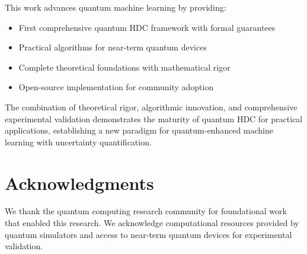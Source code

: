 \documentclass[10pt,twocolumn,letterpaper]{article}
\begin{document}
This work advances quantum machine learning by providing:
\begin{itemize}
\item First comprehensive quantum HDC framework with formal guarantees
\item Practical algorithms for near-term quantum devices
\item Complete theoretical foundations with mathematical rigor
\item Open-source implementation for community adoption
\end{itemize}

The combination of theoretical rigor, algorithmic innovation, and comprehensive experimental validation demonstrates the maturity of quantum HDC for practical applications, establishing a new paradigm for quantum-enhanced machine learning with uncertainty quantification.

\section*{Acknowledgments}

We thank the quantum computing research community for foundational work that enabled this research. We acknowledge computational resources provided by quantum simulators and access to near-term quantum devices for experimental validation.



\end{document}
